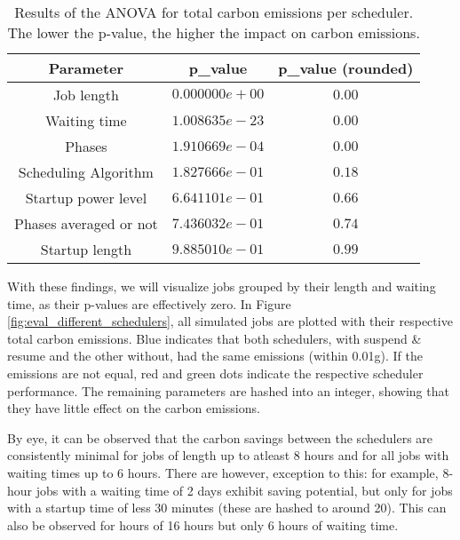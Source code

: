 \begin{table}[h!]
    \centering
    \begin{tabular}{|c|c|c|}
    \hline
        Parameter & p\_value & p\_value (rounded) \\ \hline
        Job length & $0.000000e+00$ & $0.00$ \\ \hline
        Waiting time &  $1.008635e-23$ & $0.00$ \\ \hline
        Phases &  $1.910669e-04$ & $0.00$ \\ \hline
        Scheduling Algorithm &  $1.827666e-01$ & $0.18$ \\ \hline
        Startup power level &  $6.641101e-01$ & $0.66$ \\ \hline
        Phases averaged or not &  $7.436032e-01$ & $0.74$ \\ \hline
        Startup length &  $9.885010e-01$ & $0.99$ \\ \hline
    \end{tabular}
    \caption{Results of the ANOVA for total carbon emissions per scheduler. The lower the p-value, the higher the impact on carbon emissions.}
\label{tab:scheduler_anova}
\end{table}

With these findings, we will visualize jobs grouped by their length and waiting time, as their p-values are effectively zero.
In Figure \ref{fig:eval_different_schedulers}, all simulated jobs are plotted with their respective total carbon emissions. Blue indicates that both schedulers, with suspend \& resume and the other without, had the same emissions (within 0.01g). If the emissions are not equal, red and green dots indicate the respective scheduler performance.
The remaining parameters are hashed into an integer, showing that they have little effect on the carbon emissions.

By eye, it can be observed that the carbon savings between the schedulers are consistently minimal for jobs of length up to atleast 8 hours and for all jobs with waiting times up to 6 hours.
There are however, exception to this: for example, 8-hour jobs with a waiting time of 2 days exhibit saving potential, but only for jobs with a startup time of less 30 minutes (these are hashed to around 20). This can also be observed for hours of 16 hours but only 6 hours of waiting time.


